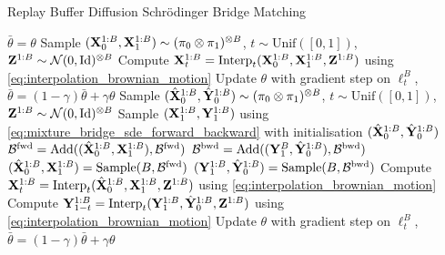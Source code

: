 \documentclass{article}
\begin{document}
\begin{algorithm}[H]
\caption{Replay Buffer Diffusion Schr\"odinger Bridge Matching}
\label{alg:online_DSBM_general_replay_buffer}
\begin{algorithmic}[1]
\STATE $\bar{\theta} = \theta$
\STATE Sample $(\mathbf{X}_0^{1:B}, \mathbf{X}_1^{1:B}) \sim (\pi_0 \otimes \pi_1)^{\otimes B}$, $t \sim \mathrm{Unif}([0,1])$, $\mathbf{Z}^{1:B} \sim \mathcal{N}(0, \mathrm{Id})^{\otimes B}$
\STATE Compute $\mathbf{X}_t^{1:B} = \mathrm{Interp}_t(\mathbf{X}_0^{1:B}, \mathbf{X}_1^{1:B}, \mathbf{Z}^{1:B})$ using \eqref{eq:interpolation_brownian_motion}
\STATE Update $\theta$ with gradient step on $\ell_t^B$, $\bar{\theta} = (1-\gamma) \bar{\theta} + \gamma \theta$
\ENDFOR
{} 
\STATE Sample $(\hat{\mathbf{X}}_0^{1:B}, \hat{\mathbf{Y}}_0^{1:B}) \sim (\pi_0 \otimes \pi_1)^{\otimes B}$, $t \sim \mathrm{Unif}([0,1])$, $\mathbf{Z}^{1:B} \sim \mathcal{N}(0, \mathrm{Id})^{\otimes B}$
\STATE Sample  $(\mathbf{X}_1^{1:B},\mathbf{Y}_1^{1:B})$ using \eqref{eq:mixture_bridge_sde_forward_backward} with initialisation $(\hat{\mathbf{X}}_0^{1:B},\hat{\mathbf{Y}}_0^{1:B})$
\STATE $\mathcal{B}^{\mathrm{fwd}} = \mathrm{Add}((\hat{\mathbf{X}}_0^{1:B}, \mathbf{X}_1^{1:B}), \mathcal{B}^{\mathrm{fwd}})$
\STATE $\mathcal{B}^{\mathrm{bwd}} = \mathrm{Add}((\mathbf{Y}_1^{B}, \hat{\mathbf{Y}}_0^{1:B}), \mathcal{B}^{\mathrm{bwd}})$
\ENDIF
\STATE $(\hat{\mathbf{X}}_0^{1:B}, \mathbf{X}_1^{1:B}) = \mathrm{Sample}(B, \mathcal{B}^{\mathrm{fwd}})$
\STATE $(\mathbf{Y}_1^{1:B}, \hat{\mathbf{Y}}_0^{1:B}) = \mathrm{Sample}(B, \mathcal{B}^{\mathrm{bwd}})$
\STATE Compute $\mathbf{X}_t^{1:B} = \mathrm{Interp}_t(\hat{\mathbf{X}}_0^{1:B}, \mathbf{X}_1^{1:B}, \mathbf{Z}^{1:B})$ using \eqref{eq:interpolation_brownian_motion}
\STATE Compute $\mathbf{Y}_{1-t}^{1:B} = \mathrm{Interp}_t(\mathbf{Y}_1^{1:B}, \hat{\mathbf{Y}}_0^{1:B}, \mathbf{Z}^{1:B})$ using \eqref{eq:interpolation_brownian_motion}
\STATE Update $\theta$ with gradient step on $\ell_t^B$, $\bar{\theta} = (1-\gamma) \bar{\theta} + \gamma \theta$
\ENDFOR
{}
\end{algorithmic}
\end{algorithm}
\end{document}
